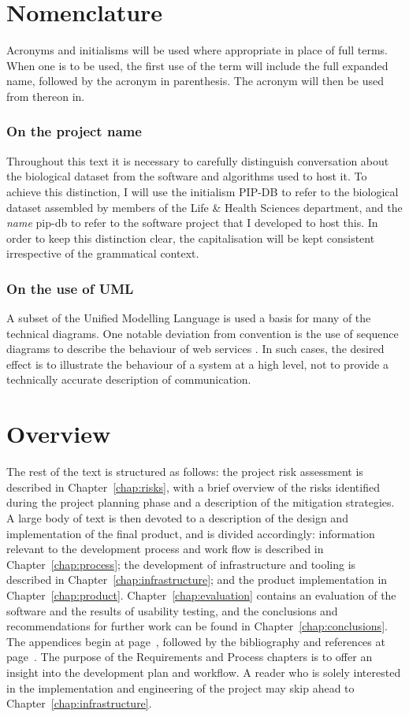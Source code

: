 \section*{Nomenclature}\label{sec:nomenclature}
Acronyms and initialisms will be used where appropriate in place of
full terms. When one is to be used, the first use of the term will
include the full expanded name, followed by the acronym in
parenthesis. The acronym will then be used from thereon in.


\subsubsection*{On the project name}
Throughout this text it is necessary to carefully distinguish
conversation about the biological dataset from the software and
algorithms used to host it. To achieve this distinction, I will use
the initialism PIP-DB to refer to the biological dataset assembled by
members of the Life \& Health Sciences department, and the
\textit{name} pip-db to refer to the software project that I developed
to host this. In order to keep this distinction clear, the
capitalisation will be kept consistent irrespective of the grammatical
context.


\subsubsection*{On the use of UML}
A subset of the Unified Modelling Language \cite{ibm2003uml} is used a
basis for many of the technical diagrams. One notable deviation from
convention is the use of sequence diagrams to describe the behaviour
of web services \cite{ibm2004sequence}. In such cases, the desired
effect is to illustrate the behaviour of a system at a high level, not
to provide a technically accurate description of communication.


\section*{Overview}\label{sec:overview}
The rest of the text is structured as follows: the project risk
assessment is described in Chapter~\ref{chap:risks}, with a brief
overview of the risks identified during the project planning phase and
a description of the mitigation strategies. A large body of text is
then devoted to a description of the design and implementation of the
final product, and is divided accordingly: information relevant to the
development process and work flow is described in
Chapter~\ref{chap:process}; the development of infrastructure and
tooling is described in Chapter~\ref{chap:infrastructure}; and the
product implementation in
Chapter~\ref{chap:product}. Chapter~\ref{chap:evaluation} contains an
evaluation of the software and the results of usability testing, and
the conclusions and recommendations for further work can be found in
Chapter~\ref{chap:conclusions}. The appendices begin at
page~\pageref{appendices}, followed by the bibliography and references
at page~\pageref{bibliography}. The purpose of the Requirements and
Process chapters is to offer an insight into the development plan and
workflow. A reader who is solely interested in the implementation and
engineering of the project may skip ahead to
Chapter~\ref{chap:infrastructure}.
